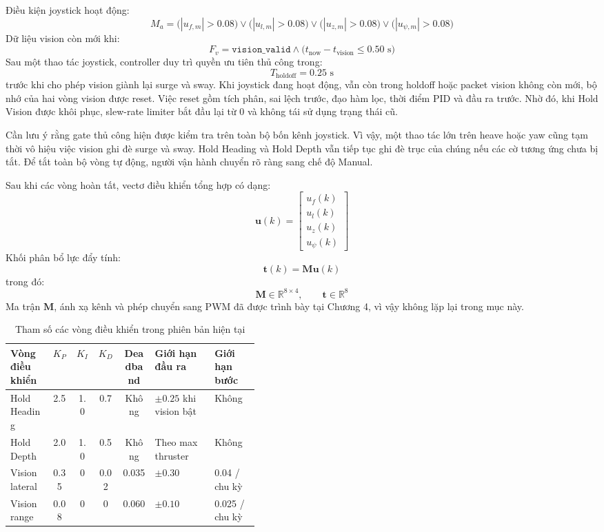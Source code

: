 \documentclass[../DoAn.tex]{subfiles}
\begin{document}
Điều kiện joystick hoạt động:
\[
M_a = \big(|u_{f,m}| > 0.08\big) \lor \big(|u_{l,m}| > 0.08\big) \lor \big(|u_{z,m}| > 0.08\big) \lor \big(|u_{\psi,m}| > 0.08\big)
\]
Dữ liệu vision còn mới khi:
\[
F_v = \texttt{vision\_valid} \land \big(t_{\mathrm{now}} - t_{\mathrm{vision}} \leq 0.50\text{ s}\big)
\]
Sau một thao tác joystick, controller duy trì quyền ưu tiên thủ công trong:
\[
T_{\mathrm{holdoff}} = 0.25\text{ s}
\]
trước khi cho phép vision giành lại surge và sway. Khi joystick đang hoạt động, vẫn còn trong holdoff hoặc packet vision không còn mới, bộ nhớ của hai vòng vision được reset. Việc reset gồm tích phân, sai lệch trước, đạo hàm lọc, thời điểm PID và đầu ra trước. Nhờ đó, khi Hold Vision được khôi phục, slew-rate limiter bắt đầu lại từ 0 và không tái sử dụng trạng thái cũ.

Cần lưu ý rằng gate thủ công hiện được kiểm tra trên toàn bộ bốn kênh joystick. Vì vậy, một thao tác lớn trên heave hoặc yaw cũng tạm thời vô hiệu việc vision ghi đè surge và sway. Hold Heading và Hold Depth vẫn tiếp tục ghi đè trục của chúng nếu các cờ tương ứng chưa bị tắt. Để tắt toàn bộ vòng tự động, người vận hành chuyển rõ ràng sang chế độ Manual.

Sau khi các vòng hoàn tất, vectơ điều khiển tổng hợp có dạng:
\[
\mathbf{u}(k) = 
\begin{bmatrix}
u_f(k) \\ u_l(k) \\ u_z(k) \\ u_\psi(k)
\end{bmatrix}
\]
Khối phân bổ lực đẩy tính:
\[
\mathbf{t}(k) = \mathbf{M}\mathbf{u}(k)
\]
trong đó:
\[
\mathbf{M} \in \mathbb{R}^{8 \times 4}, \qquad \mathbf{t} \in \mathbb{R}^{8}
\]
Ma trận $\mathbf{M}$, ánh xạ kênh và phép chuyển sang PWM đã được trình bày tại Chương 4, vì vậy không lặp lại trong mục này.

\begin{table}[htbp]
    \centering
    \caption{Tham số các vòng điều khiển trong phiên bản hiện tại}
    \label{tab:thamso_vongdieukhien}
    \renewcommand{\arraystretch}{1.3}
    \begin{tabular}{|l|c|c|c|c|p{0.24\linewidth}|p{0.18\linewidth}|}
        \hline
        \textbf{Vòng điều khiển} & $K_P$ & $K_I$ & $K_D$ & \textbf{Deadband} & \textbf{Giới hạn đầu ra} & \textbf{Giới hạn bước} \\
        \hline
        Hold Heading & 2.5 & 1.0 & 0.7 & Không & $\pm 0.25$ khi vision bật & Không \\
        \hline
        Hold Depth & 2.0 & 1.0 & 0.5 & Không & Theo max thruster & Không \\
        \hline
        Vision lateral & 0.35 & 0 & 0.02 & 0.035 & $\pm 0.30$ & 0.04 / chu kỳ \\
        \hline
        Vision range & 0.08 & 0 & 0 & 0.060 & $\pm 0.10$ & 0.025 / chu kỳ \\
        \hline
    \end{tabular}
\end{table}
\end{document}
